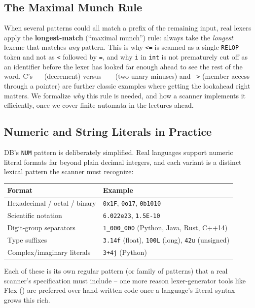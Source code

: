 \documentclass[full-course-notes.tex]{subfiles}
\begin{document}
\subsection{The Maximal Munch Rule}

When several patterns could all match a prefix of the remaining input, real lexers apply the
\textbf{longest-match} (``maximal munch'') rule: always take the \emph{longest} lexeme that
matches \emph{any} pattern. This is why \texttt{<=} is scanned as a single \texttt{RELOP} token
and not as \texttt{<} followed by \texttt{=}, and why \texttt{i} in \texttt{int} is not
prematurely cut off as an identifier before the lexer has looked far enough ahead to see the
rest of the word. C's \texttt{-{}-{}} (decrement) versus \texttt{-} \texttt{-} (two unary
minuses) and \texttt{-{}>} (member access through a pointer) are further classic examples where
getting the lookahead right matters. We formalize \emph{why} this rule is needed, and how a
scanner implements it efficiently, once we cover finite automata in the lectures ahead.

\subsection{Numeric and String Literals in Practice}

DB's \texttt{NUM} pattern is deliberately simplified. Real languages support numeric literal
formats far beyond plain decimal integers, and each variant is a distinct lexical pattern the
scanner must recognize:

\begin{center}
\small
\begin{tabularx}{\textwidth}{@{}l X@{}}
\toprule
\textbf{Format} & \textbf{Example} \\
\midrule
Hexadecimal / octal / binary & \texttt{0x1F}, \texttt{0o17}, \texttt{0b1010} \\
Scientific notation & \texttt{6.022e23}, \texttt{1.5E-10} \\
Digit-group separators & \texttt{1\_000\_000} (Python, Java, Rust, C++14) \\
Type suffixes & \texttt{3.14f} (float), \texttt{100L} (long), \texttt{42u} (unsigned) \\
Complex/imaginary literals & \texttt{3+4j} (Python) \\
\bottomrule
\end{tabularx}
\end{center}

Each of these is its own regular pattern (or family of patterns) that a real scanner's
specification must include -- one more reason lexer-generator tools like Flex
() are preferred over hand-written code once a language's literal
syntax grows this rich.
\end{document}
